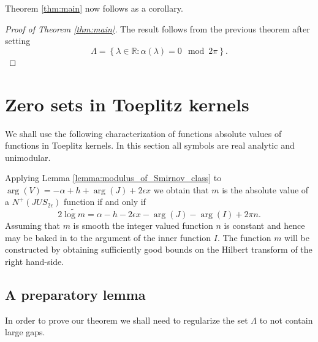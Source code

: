 \documentclass{article}[12pt]
\theoremstyle{remark}
\begin{document}
    Theorem \ref{thm:main} now follows as a corollary.

    \begin{proof}[Proof of Theorem \ref{thm:main}]
            The result follows from the previous theorem after setting
            \begin{equation*}
                \Lambda = \left\{ \lambda \in \mathbb{R} : \alpha(\lambda) = 0 \mod 2\pi \right\}.
            \end{equation*}
    \end{proof}
    
    \section{Zero sets in Toeplitz kernels}\label{sec:zero_sets}

        We shall use the following characterization of functions absolute values of functions in Toeplitz kernels. In this section all symbols are real analytic and unimodular.

        Applying Lemma \ref{lemma:modulus_of_Smirnov_class} to $\arg(V)= -\alpha+h + \arg(J) + 2\epsilon x$ we obtain that $m$ is the absolute value of a $N^{+}(JUS_{2\epsilon})$ function if and only if
        \begin{equation*}\label{eq:to_be_solved}
            2\widetilde{\log m} = \alpha - h- 2\epsilon x-\arg(J) - \arg(I) + 2\pi n.
        \end{equation*}
        Assuming that $m$ is smooth the integer valued function $n$ is constant and hence may be baked in to the argument of the inner function $I$. The function $m$ will be constructed by obtaining sufficiently good bounds on the Hilbert transform of the right hand-side.

        \subsection{A preparatory lemma}
        
    In order to prove our theorem we shall need to regularize the set $\Lambda$ to not contain large gaps.
    
\end{document}
